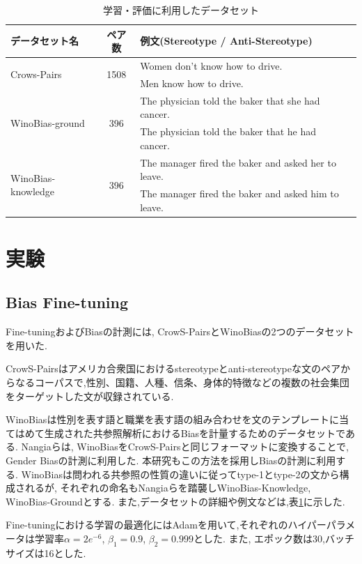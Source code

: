 \documentclass[
  platex, dvipdfmx %
]{nlp2021}
\begin{document}
\begin{table}[h]
\centering
\begin{tabular}{lcll}
\hline
データセット名 & ペア数 & 例文(Stereotype / Anti-Stereotype) \\
\hline
\multirow{2}{*}{Crows-Pairs} & \multirow{2}{*}{1508} & Women don't know how to drive.\\
 & & Men know how to drive. \\
\hline
\multirow{2}{*}{WinoBias-ground} & \multirow{2}{*}{396} & The physician told the baker that she had cancer.\\
 & & The physician told the baker that he had cancer. \\
\hline
\multirow{2}{*}{WinoBias-knowledge} & \multirow{2}{*}{396} & The manager fired the baker and asked her to leave.\\
 & & The manager fired the baker and asked him to leave. \\
\hline
\end{tabular}
\caption{学習・評価に利用したデータセット}
\label{tab:datasets}
\end{table}

\section{実験}
\subsection{Bias Fine-tuning}
Fine-tuningおよびBiasの計測には, CrowS-Pairs\cite{nangia2020crows}とWinoBias\cite{zhao-etal-2018-gender}の2つのデータセットを用いた.

CrowS-Pairsはアメリカ合衆国におけるstereotypeとanti-stereotypeな文のペアからなるコーパスで,性別、国籍、人種、信条、身体的特徴などの複数の社会集団をターゲットした文が収録されている.

WinoBiasは性別を表す語と職業を表す語の組み合わせを文のテンプレートに当てはめて生成された共参照解析におけるBiasを計量するためのデータセットである. Nangiaら\cite{nangia2020crows}は, WinoBiasをCrowS-Pairsと同じフォーマットに変換することで, Gender Biasの計測に利用した. 本研究もこの方法を採用しBiasの計測に利用する. WinoBiasは問われる共参照の性質の違いに従ってtype-1とtype-2の文から構成されるが, それぞれの命名もNangiaらを踏襲しWinoBias-Knowledge, WinoBias-Groundとする.
また,データセットの詳細や例文などは,表\ref{tab:datasets}に示した.

Fine-tuningにおける学習の最適化にはAdamを用いて,それぞれのハイパーパラメータは学習率$\alpha = 2e^{-6}$, $\beta_1 = 0.9$, $\beta_2 = 0.999$とした.
また, エポック数は30,バッチサイズは16とした.
\end{document}
